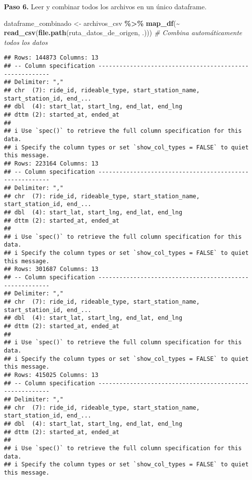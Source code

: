 \documentclass[
]{article}
\newenvironment{Shaded}{\begin{snugshade}}{\end{snugshade}}
\newcommand{\CommentTok}[1]{\textcolor[rgb]{0.56,0.35,0.01}{\textit{#1}}}
\newcommand{\FunctionTok}[1]{\textcolor[rgb]{0.13,0.29,0.53}{\textbf{#1}}}
\newcommand{\NormalTok}[1]{#1}
\newcommand{\OtherTok}[1]{\textcolor[rgb]{0.56,0.35,0.01}{#1}}
\newcommand{\SpecialCharTok}[1]{\textcolor[rgb]{0.81,0.36,0.00}{\textbf{#1}}}
\begin{document}
\hfill\break
\textbf{Paso 6.} Leer y combinar todos los archivos en un único
dataframe.

\begin{Shaded}
\begin{Highlighting}[]
\NormalTok{dataframe\_combinado }\OtherTok{\textless{}{-}}\NormalTok{ archivos\_csv }\SpecialCharTok{\%\textgreater{}\%}
  \FunctionTok{map\_df}\NormalTok{(}\SpecialCharTok{\textasciitilde{}} \FunctionTok{read\_csv}\NormalTok{(}\FunctionTok{file.path}\NormalTok{(ruta\_datos\_de\_origen, .))) }\CommentTok{\# Combina automáticamente todos los datos}
\end{Highlighting}
\end{Shaded}

\begin{verbatim}
## Rows: 144873 Columns: 13
## -- Column specification --------------------------------------------------------
## Delimiter: ","
## chr  (7): ride_id, rideable_type, start_station_name, start_station_id, end_...
## dbl  (4): start_lat, start_lng, end_lat, end_lng
## dttm (2): started_at, ended_at
## 
## i Use `spec()` to retrieve the full column specification for this data.
## i Specify the column types or set `show_col_types = FALSE` to quiet this message.
## Rows: 223164 Columns: 13
## -- Column specification --------------------------------------------------------
## Delimiter: ","
## chr  (7): ride_id, rideable_type, start_station_name, start_station_id, end_...
## dbl  (4): start_lat, start_lng, end_lat, end_lng
## dttm (2): started_at, ended_at
## 
## i Use `spec()` to retrieve the full column specification for this data.
## i Specify the column types or set `show_col_types = FALSE` to quiet this message.
## Rows: 301687 Columns: 13
## -- Column specification --------------------------------------------------------
## Delimiter: ","
## chr  (7): ride_id, rideable_type, start_station_name, start_station_id, end_...
## dbl  (4): start_lat, start_lng, end_lat, end_lng
## dttm (2): started_at, ended_at
## 
## i Use `spec()` to retrieve the full column specification for this data.
## i Specify the column types or set `show_col_types = FALSE` to quiet this message.
## Rows: 415025 Columns: 13
## -- Column specification --------------------------------------------------------
## Delimiter: ","
## chr  (7): ride_id, rideable_type, start_station_name, start_station_id, end_...
## dbl  (4): start_lat, start_lng, end_lat, end_lng
## dttm (2): started_at, ended_at
## 
## i Use `spec()` to retrieve the full column specification for this data.
## i Specify the column types or set `show_col_types = FALSE` to quiet this message.

\end{verbatim}
\end{document}
